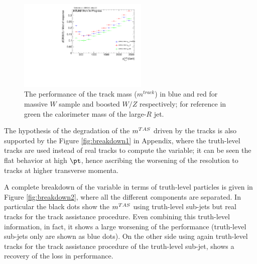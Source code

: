 \begin{figure}[!ht]
  \centering
      \includegraphics[width=0.55\textwidth]{jet_part/calib/71graphcftr_h_JetRatio_mJ12CALOIQRoMcalib_trkmass.pdf}
  \caption[Track mass degradation in tops and massive $W/Z$]{The performance of the track mass ($m^{track}$) in blue and red for massive $W$ sample and boosted $W/Z$ respectively; for reference in green the calorimeter mass of the large-$R$ jet.}
  \label{fig:trackdegrade}
\end{figure}
The hypothesis of the degradation of the $m^{TAS}$ driven by the tracks is also supported by the Figure \ref{fig:breakdown1} in Appendix, where the truth-level tracks are used instead of real tracks to compute the variable; it can be seen the flat behavior at high $\pt$, hence ascribing the worsening of the resolution to tracks at higher transverse momenta.

A complete breakdown of the variable in terms of truth-level particles is given in Figure \ref{fig:breakdown2}, where all the different components are separated.
In particular the black dots show the $m^{TAS}$ using truth-level sub-jets but real tracks for the track assistance procedure.
Even combining this truth-level information, in fact, it shows a large worsening of the performance (truth-level sub-jets only are shown as blue dots).
On the other side using again truth-level tracks for the track assistance procedure of the truth-level sub-jet, shows a recovery of the loss in performance.




